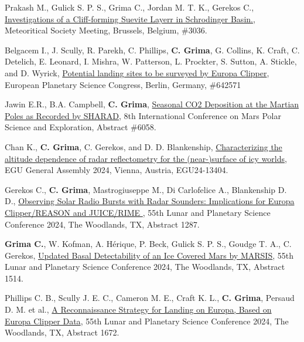 \begin{etaremune}
\item 
    Prakash M., Gulick S. P. S., Grima C., Jordan M. T. K., Gerekos C., \href{https://www.hou.usra.edu/meetings/metsoc2024/pdf/6311.pdf}{Investigations of a Cliff-forming Suevite Layerr in Schrodinger Basin.}, Meteoritical Society Meeting, Brussels, Belgium, \#3036.

\item 
    Belgacem I., J. Scully, R. Parekh, C. Phillips, \textbf{C. Grima}, G. Collins, K. Craft, C. Detelich, E. Leonard, I. Mishra, W. Patterson, L. Prockter, S. Sutton, A. Stickle, and D. Wyrick, \href{}{Potential landing sites to be surveyed by Europa Clipper}, European Planetary Science Congress, Berlin, Germany, \#642571

\item
    Jawin E.R., B.A. Campbell, \textbf{C. Grima}, \href{}{Seasonal CO2 Deposition at the Martian Poles as Recorded by SHARAD}, 8th International Conference on Mars Polar Science and Exploration, Abstract \#6058.

\item
     Chan K., \textbf{C. Grima}, C. Gerekos, and D. D. Blankenship, \href{https://meetingorganizer.copernicus.org/EGU24/EGU24-13404.html}{Characterizing the altitude dependence of radar reflectometry for the (near-)surface of icy worlds}, EGU General Assembly 2024, Vienna, Austria, EGU24-13404.

\item
     Gerekos C., \textbf{C. Grima}, Mastrogiuseppe M., Di Carlofelice A., Blankenship D. D., \href{https://www.hou.usra.edu/meetings/lpsc2024/pdf/1287.pdf}{Observing Solar Radio Bursts with Radar Sounders: Implications for Europa Clipper/REASON and JUICE/RIME }, 55th Lunar and Planetary Science Conference 2024, The Woodlands, TX, Abstract 1287.

\item
    \textbf{Grima C.}, W. Kofman, A. Hérique, P. Beck, Gulick S. P. S., Goudge T. A., C. Gerekos, \href{https://www.hou.usra.edu/meetings/lpsc2024/pdf/1514.pdf}{Updated Basal Detectability of an Ice Covered Mars by MARSIS}, 55th Lunar and Planetary Science Conference 2024, The Woodlands, TX, Abstract 1514.

\item
     Phillips C. B., Scully J. E. C., Cameron M. E., Craft K. L., \textbf{C. Grima}, Persaud D. M. et al., \href{https://www.hou.usra.edu/meetings/lpsc2024/pdf/1672.pdf}{A Reconnaissance Strategy for Landing on Europa, Based on Europa Clipper Data}, 55th Lunar and Planetary Science Conference 2024, The Woodlands, TX, Abstract 1672.


\end{etaremune}

